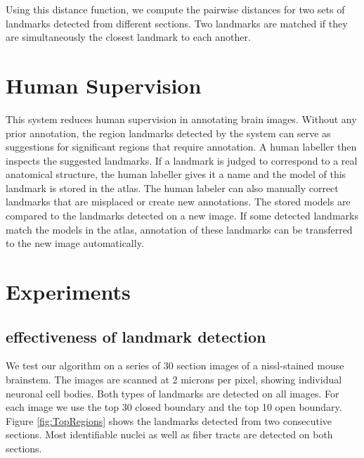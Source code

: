 \documentclass{llncs}
\begin{document}
Using this distance function, we compute the pairwise distances for two sets of landmarks detected from different sections. Two landmarks are matched if they are simultaneously the closest landmark to each another.

\section{Human Supervision}

This system reduces human supervision in annotating brain images. Without any prior annotation, the region landmarks detected by the system can serve as suggestions for significant regions that require annotation. A human labeller then inspects the suggested landmarks. If a landmark is judged to correspond to a real anatomical structure, the human labeller gives it a name and the model of this landmark is stored in the atlas. The human labeler can also manually correct landmarks that are misplaced or create new annotations.
The stored models are compared to the landmarks detected on a new image. If some detected landmarks match the models in the atlas, annotation of these landmarks can be transferred to the new image automatically.



\section{Experiments}

\subsection{effectiveness of landmark detection}

We test our algorithm on a series of 30 section images of a nissl-stained mouse brainstem. The images are scanned at 2 microns per pixel, showing individual neuronal cell bodies. Both types of landmarks are detected on all images. For each image we use the top 30 closed boundary and the top 10 open boundary. Figure \ref{fig:TopRegions} shows the landmarks detected from two consecutive sections. Most identifiable nuclei as well as fiber tracts are detected on both sections.

\end{document}
